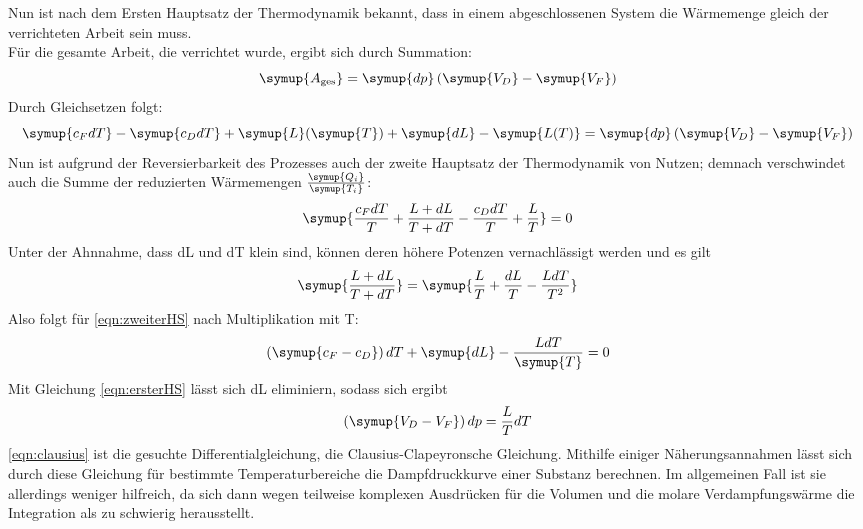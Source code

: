 Nun ist nach dem Ersten Hauptsatz der Thermodynamik bekannt, dass in einem abgeschlossenen System die Wärmemenge gleich der verrichteten Arbeit 
sein muss.\\
Für die gesamte Arbeit, die verrichtet wurde, ergibt sich durch Summation:
\begin{equation}
\symup{A_\text{ges}} = \symup{dp} \left( \symup{V_D} - \symup{V_F} \right)
\end{equation}
Durch Gleichsetzen folgt:
\begin{equation}
\symup{c_F dT} - \symup{c_D dT} + \symup{L}(\symup{T}) + \symup{dL} - \symup{L(T)} = \symup{dp} \left( \symup{V_D} - \symup{V_F} \right)
\label{eqn:ersterHS}
\end{equation}
Nun ist aufgrund der Reversierbarkeit des Prozesses auch der zweite Hauptsatz der
Thermodynamik von Nutzen; demnach verschwindet auch die Summe der reduzierten
Wärmemengen $\frac{\symup{Q_i}}{\symup{T_i}}$:
\begin{equation}
\symup{\frac{c_F dT}{T} + \frac{L + dL}{T + dT} - \frac{c_D dT}{T} + \frac{L}{T}} = 0
\label{eqn:zweiterHS}
\end{equation}
Unter der Ahnnahme, dass dL und dT klein sind, können deren höhere Potenzen 
vernachlässigt werden und es gilt
\begin{equation}
\symup{\frac{L + dL}{T + dT}} = \symup{\frac{L}{T} + \frac{dL}{T} - \frac{L dT}{T^2}}
\end{equation}
Also folgt für \eqref{eqn:zweiterHS} nach Multiplikation mit T:
\begin{equation}
\left( \symup{c_F - c_D} \right) dT + \symup{dL} - \frac{L dT}{\symup{T}} = 0
\end{equation}
Mit Gleichung \eqref{eqn:ersterHS} lässt sich dL eliminiern, sodass sich ergibt
\begin{equation}
\left( \symup{ V_D - V_F} \right) dp = \frac{L}{T} dT
\label{eqn:clausius}
\end{equation}
\eqref{eqn:clausius} ist die gesuchte Differentialgleichung, die Clausius-Clapeyronsche
Gleichung. Mithilfe einiger Näherungsannahmen lässt sich durch diese Gleichung
für bestimmte Temperaturbereiche die Dampfdruckkurve einer Substanz berechnen. Im 
allgemeinen Fall ist sie allerdings weniger hilfreich, da sich dann wegen teilweise
komplexen Ausdrücken für die Volumen und die molare Verdampfungswärme die Integration
als zu schwierig herausstellt.

